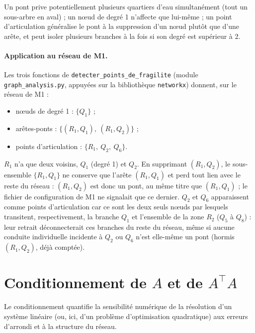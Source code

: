 \documentclass[11pt,a4paper]{article}
\theoremstyle{plain}
\theoremstyle{definition}
\theoremstyle{remark}
\begin{document}
Un pont prive potentiellement plusieurs quartiers d'eau simultanément (tout
un sous-arbre en aval) ; un nœud de degré 1 n'affecte que lui-même ; un
point d'articulation généralise le pont à la suppression d'un nœud plutôt
que d'une arête, et peut isoler plusieurs branches à la fois si son degré
est supérieur à 2.

\paragraph{Application au réseau de M1.} Les trois fonctions de
\texttt{detecter\_points\_de\_fragilite} (module \texttt{graph\_analysis.py},
appuyées sur la bibliothèque \texttt{networkx}) donnent, sur le réseau de
M1 :
\begin{itemize}[nosep]
\item nœuds de degré 1 : $\{Q_1\}$ ;
\item arêtes-ponts : $\{(R_1,Q_1),\ (R_1,Q_2)\}$ ;
\item points d'articulation : $\{R_1,\ Q_2,\ Q_6\}$.
\end{itemize}
$R_1$ n'a que deux voisins, $Q_1$ (degré 1) et $Q_2$. En supprimant
$(R_1,Q_2)$, le sous-ensemble $\{R_1, Q_1\}$ ne conserve que l'arête
$(R_1,Q_1)$ et perd tout lien avec le reste du réseau : $(R_1,Q_2)$ est
donc un pont, au même titre que $(R_1,Q_1)$ ; le fichier de configuration
de M1 ne signalait que ce dernier. $Q_2$ et $Q_6$ apparaissent comme
points d'articulation car ce sont les deux seuls nœuds par lesquels
transitent, respectivement, la branche $Q_1$ et l'ensemble de la zone
$R_2$ ($Q_5$ à $Q_8$) : leur retrait déconnecterait ces branches du reste
du réseau, même si aucune conduite individuelle incidente à $Q_2$ ou $Q_6$
n'est elle-même un pont (hormis $(R_1,Q_2)$, déjà comptée).

\section{Conditionnement de $A$ et de $A^\top A$}

Le conditionnement quantifie la sensibilité numérique de la résolution
d'un système linéaire (ou, ici, d'un problème d'optimisation quadratique)
aux erreurs d'arrondi et à la structure du réseau.
\end{document}
